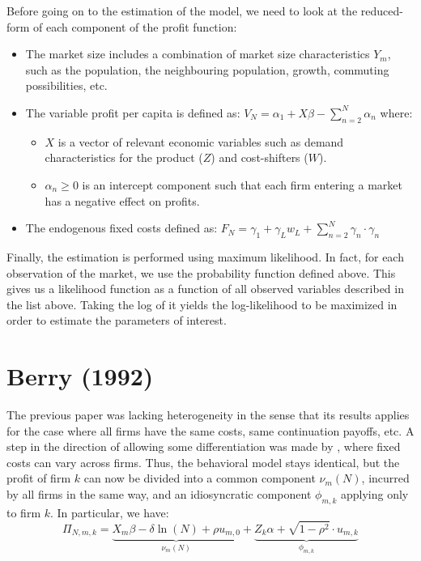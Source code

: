 Before going on to the estimation of the model, we need to look at the reduced-form of each component of the profit function:\begin{itemize}
\item The market size includes a combination of market size characteristics $Y_m$, such as the population, the neighbouring population, growth, commuting possibilities, etc.
\item The variable profit per capita is defined as: $V_N = \alpha_1 + X\beta - \sum_{n=2}^{N} \alpha_n $ where:\begin{itemize}
\item $X$ is a vector of relevant economic variables such as demand characteristics for the product ($Z$) and cost-shifters ($W$).
\item $\alpha_n\geq 0$ is an intercept component such that each firm entering a market has a negative effect on profits. 
\end{itemize}
\item The endogenous fixed costs defined as: $F_N = \gamma_1 + \gamma_Lw_L + \sum_{n=2}^{N}\gamma_n\cdot\gamma_n $ 
\end{itemize}

Finally, the estimation is performed using maximum likelihood. In fact, for each observation of the market, we use the probability function defined above. This gives us a likelihood function as a function of all observed variables described in the list above. Taking the log of it yields the log-likelihood to be maximized in order to estimate the parameters of interest.

\section{Berry (1992)}

The previous paper was lacking heterogeneity in the sense that its results applies for the case where all firms have the same costs, same continuation payoffs, etc. A step in the direction of allowing some differentiation was made by \cite{berry_92}, where fixed costs can vary across firms. Thus, the behavioral model stays identical, but the profit of firm $k$ can now be divided into a common component $\nu_m(N)$, incurred by all firms in the same way, and an idiosyncratic component $\phi_{m,k}$ applying only to firm $k$. In particular, we have: $$ \Pi_{N,m,k} = \underbrace{X_m\beta - \delta\ln(N) + \rho u_{m,0}}_{\nu_m(N)} + \underbrace{Z_k\alpha + \sqrt{1 - \rho^2}\cdot u_{m,k}}_{\phi_{m,k}} $$ 


